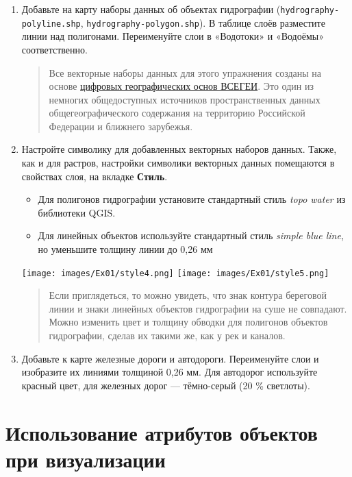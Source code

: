 \documentclass[
  12pt,
]{book}
\providecommand{\tightlist}{%
  \setlength{\itemsep}{0pt}\setlength{\parskip}{0pt}}
\begin{document}
\begin{enumerate}
\def\labelenumi{\arabic{enumi}.}
\item
  Добавьте на карту наборы данных об объектах гидрографии (\texttt{hydrography-polyline.shp}, \texttt{hydrography-polygon.shp}). В таблице слоёв разместите линии над полигонами. Переименуйте слои в «Водотоки» и «Водоёмы» соответственно.

  \begin{quote}
  Все векторные наборы данных для этого упражнения созданы на основе \href{http://www.vsegei.com/ru/info/topo/}{цифровых географических основ ВСЕГЕИ}. Это один из немногих общедоступных источников пространственных данных общегеографического содержания на территорию Российской Федерации и ближнего зарубежья.
  \end{quote}
\item
  Настройте символику для добавленных векторных наборов данных. Также, как и для растров, настройки символики векторных данных помещаются в свойствах слоя, на вкладке \textbf{Стиль}.

  \begin{itemize}
  \tightlist
  \item
    Для полигонов гидрографии установите стандартный стиль \emph{topo water} из библиотеки QGIS.\\
  \item
    Для линейных объектов используйте стандартный стиль \emph{simple blue line}, но уменьшите толщину линии до 0,26 мм
  \end{itemize}

  \texttt{[image: images/Ex01/style4.png]}
  \texttt{[image: images/Ex01/style5.png]}

  \begin{quote}
  Если приглядеться, то можно увидеть, что знак контура береговой линии и знаки линейных объектов гидрографии на суше не совпадают. Можно изменить цвет и толщину обводки для полигонов объектов гидрографии, сделав их такими же, как у рек и каналов.
  \end{quote}
\item
  Добавьте к карте железные дороги и автодороги. Переименуйте слои и изобразите их линиями толщиной 0,26 мм. Для автодорог используйте красный цвет, для железных дорог --- тёмно-серый (20 \% светлоты).
\end{enumerate}

\hypertarget{map-design-general-attributes}{%
\section{Использование атрибутов объектов при визуализации}\label{map-design-general-attributes}}
\end{document}
